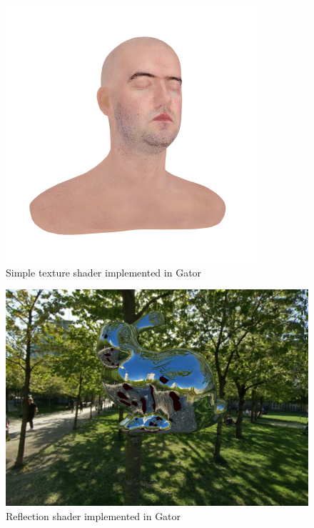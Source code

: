 {\begin{figure}
    \centering
    \includegraphics[width=.7\linewidth]{fig/texture.png}
    \caption{Simple texture shader implemented in Gator}
    \label{fig:texture}
\end{figure}
\begin{figure}
	\centering
	\includegraphics[width=.7\linewidth]{fig/reflection.png}
	\caption{Reflection  shader implemented in Gator}
	\label{fig:reflection}
\end{figure}
	
}
